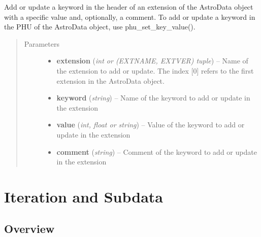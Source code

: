 \documentclass[letterpaper,10pt,english]{sphinxmanual}
\begin{document}
\begin{fulllineitems}
\label{chapter_AstroDataClass:astrodata.data.AstroData.ext_set_key_value}
Add or update a keyword in the header of an extension of the AstroData
object with a specific value and, optionally, a comment. To add or
update a keyword in the PHU of the AstroData object, use
phu\_set\_key\_value().
\begin{quote}\begin{description}
\item[{Parameters}] \leavevmode\begin{itemize}
\item {} 
\textbf{extension} (\emph{int or (EXTNAME, EXTVER) tuple}) -- Name of the extension to add or update. The index {[}0{]}
refers to the first extension in the AstroData
object.

\item {} 
\textbf{keyword} (\emph{string}) -- Name of the keyword to add or update in the extension

\item {} 
\textbf{value} (\emph{int, float or string}) -- Value of the keyword to add or update in the extension

\item {} 
\textbf{comment} (\emph{string}) -- Comment of the keyword to add or update in the
extension

\end{itemize}

\end{description}\end{quote}

\end{fulllineitems}



\section{Iteration and Subdata}
\label{chapter_AstroDataClass:iteration-and-subdata}

\subsection{Overview}
\label{chapter_AstroDataClass:overview}
\end{document}
